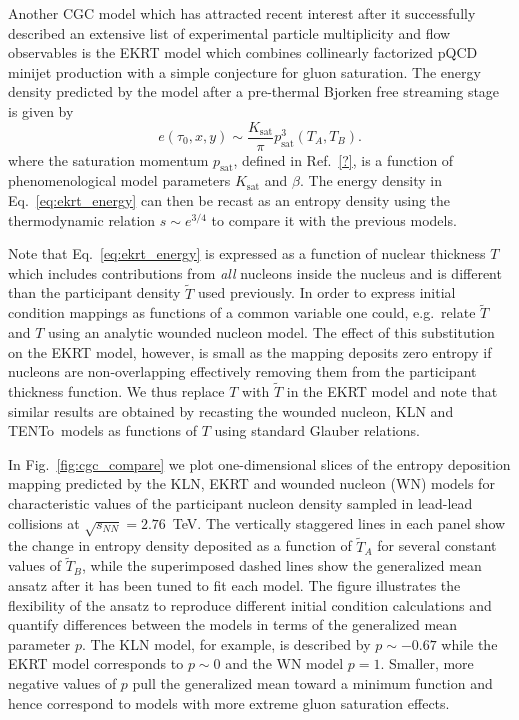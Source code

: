 \documentclass[aps,prc,reprint,amsmath,nofootinbib,superscriptaddress]{revtex4-1}
\newcommand{\trento}{T\raisebox{-0.5ex}{R}ENTo}
\newcommand{\sqrts}{\sqrt{s_{NN}}}
\newcommand{\T}{\tilde{T}}
\begin{document}
Another CGC model which has attracted recent interest after it successfully described an extensive list of experimental particle multiplicity and flow observables is the EKRT model which combines collinearly factorized pQCD minijet production with a simple conjecture for gluon saturation.
The energy density predicted by the model after a pre-thermal Bjorken free streaming stage is given by
\begin{equation}
  e(\tau_0, x, y) \sim \frac{K_\text{sat}}{\pi} p_\text{sat}^3(T_A, T_B).
  \label{eq:ekrt_energy}
\end{equation}
where the saturation momentum $p_\text{sat}$, defined in Ref.~\ref{?}, is a function of phenomenological model parameters $K_\text{sat}$ and $\beta$.
The energy density in Eq.~\eqref{eq:ekrt_energy} can then be recast as an entropy density using the thermodynamic relation ${s \sim e^{3/4}}$ to compare it with the previous models.

Note that Eq.~\eqref{eq:ekrt_energy} is expressed as a function of nuclear thickness $T$ which includes contributions from \emph{all} nucleons inside the nucleus and is different than the participant density $\T$ used previously.
In order to express initial condition mappings as functions of a common variable one could, e.g.\ relate $\T$ and $T$ using an analytic wounded nucleon model.
The effect of this substitution on the EKRT model, however, is small as the mapping deposits zero entropy if nucleons are non-overlapping effectively removing them from the participant thickness function.
We thus replace $T$ with $\T$ in the EKRT model and note that similar results are obtained by recasting the wounded nucleon, KLN and \trento\ models as functions of $T$ using standard Glauber relations.

In Fig.~\ref{fig:cgc_compare} we plot one-dimensional slices of the entropy deposition mapping predicted by the KLN, EKRT and wounded nucleon (WN) models for characteristic values of the participant nucleon density sampled in lead-lead collisions at $\sqrts=2.76$~TeV.
The vertically staggered lines in each panel show the change in entropy density deposited as a function of $\T_A$ for several constant values of $\T_B$, while the superimposed dashed lines show the generalized mean ansatz after it has been tuned to fit each model.
The figure illustrates the flexibility of the ansatz to reproduce different initial condition calculations and quantify differences between the models in terms of the generalized mean parameter $p$.
The KLN model, for example, is described by $p\sim-0.67$ while the EKRT model corresponds to $p \sim 0$ and the WN model $p=1$.
Smaller, more negative values of $p$ pull the generalized mean toward a minimum function and hence correspond to models with more extreme gluon saturation effects.
\end{document}
